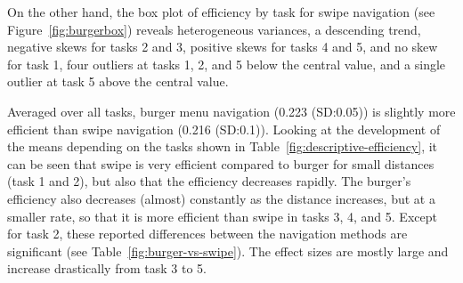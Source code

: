 \documentclass{sig-alternate-05-2015}
\begin{document}
On the other hand, the box plot of efficiency by task for swipe navigation
(see Figure~\ref{fig:burgerbox}) reveals heterogeneous variances,
a descending trend, negative skews for tasks 2 and 3, positive skews for tasks 4 and 5, and no skew for task 1,
four outliers at tasks 1, 2, and 5 below the central value,
and a single outlier at task 5 above the central value.

Averaged over all tasks, burger menu navigation (0.223 (SD:\@0.05)) is slightly more efficient than swipe navigation (0.216 (SD:\@0.1)). Looking at the
development of the means depending on the tasks shown in Table~\ref{fig:descriptive-efficiency}, it can be seen that swipe is very efficient compared to burger for small distances (task 1 and 2), 
but also that the efficiency decreases rapidly. The burger's efficiency also decreases (almost) constantly as the distance increases, but at a smaller rate, so that it is more efficient than swipe
in tasks 3, 4, and 5. Except for task 2, these reported differences between the navigation methods are significant (see Table~\ref{fig:burger-vs-swipe}). The effect sizes are mostly large and
increase drastically from task 3 to 5.
\begin{table}[!h]
\centering
\caption{Mean (standard deviation) of efficiency}
\label{fig:descriptive-efficiency}
\end{table}
\end{document}
